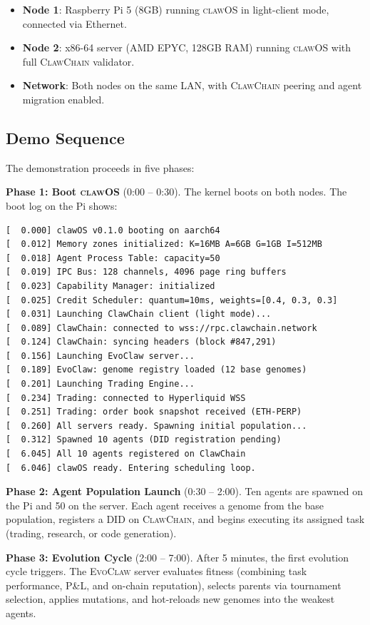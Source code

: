\documentclass{article}
\newcommand{\clawos}{\textsc{clawOS}}
\newcommand{\evoclaw}{\textsc{EvoClaw}}
\newcommand{\clawchain}{\textsc{ClawChain}}
\begin{document}
\begin{itemize}[leftmargin=*]
    \item \textbf{Node 1}: Raspberry Pi 5 (8GB) running \clawos{} in light-client mode, connected via Ethernet.
    \item \textbf{Node 2}: x86-64 server (AMD EPYC, 128GB RAM) running \clawos{} with full \clawchain{} validator.
    \item \textbf{Network}: Both nodes on the same LAN, with \clawchain{} peering and agent migration enabled.
\end{itemize}

\subsection{Demo Sequence}

The demonstration proceeds in five phases:

\textbf{Phase 1: Boot \clawos{}} (0:00 -- 0:30).
The kernel boots on both nodes. The boot log on the Pi shows:

\begin{lstlisting}[style=rustcode, caption={clawOS boot log on Raspberry Pi 5.}]
[  0.000] clawOS v0.1.0 booting on aarch64
[  0.012] Memory zones initialized: K=16MB A=6GB G=1GB I=512MB
[  0.018] Agent Process Table: capacity=50
[  0.019] IPC Bus: 128 channels, 4096 page ring buffers
[  0.023] Capability Manager: initialized
[  0.025] Credit Scheduler: quantum=10ms, weights=[0.4, 0.3, 0.3]
[  0.031] Launching ClawChain client (light mode)...
[  0.089] ClawChain: connected to wss://rpc.clawchain.network
[  0.124] ClawChain: syncing headers (block #847,291)
[  0.156] Launching EvoClaw server...
[  0.189] EvoClaw: genome registry loaded (12 base genomes)
[  0.201] Launching Trading Engine...
[  0.234] Trading: connected to Hyperliquid WSS
[  0.251] Trading: order book snapshot received (ETH-PERP)
[  0.260] All servers ready. Spawning initial population...
[  0.312] Spawned 10 agents (DID registration pending)
[  6.045] All 10 agents registered on ClawChain
[  6.046] clawOS ready. Entering scheduling loop.
\end{lstlisting}

\textbf{Phase 2: Agent Population Launch} (0:30 -- 2:00).
Ten agents are spawned on the Pi and 50 on the server. Each agent receives a genome from the base population, registers a DID on \clawchain{}, and begins executing its assigned task (trading, research, or code generation).

\textbf{Phase 3: Evolution Cycle} (2:00 -- 7:00).
After 5 minutes, the first evolution cycle triggers. The \evoclaw{} server evaluates fitness (combining task performance, P\&L, and on-chain reputation), selects parents via tournament selection, applies mutations, and hot-reloads new genomes into the weakest agents.
\end{document}
